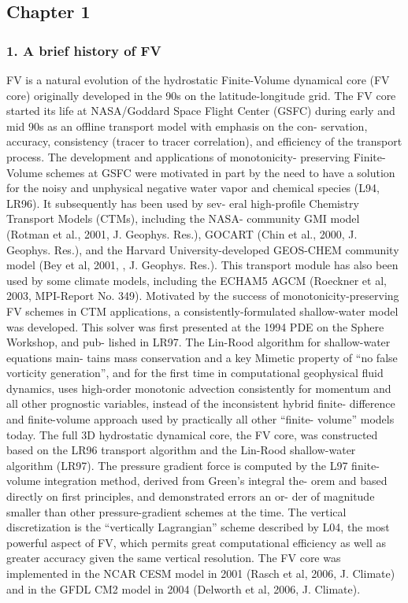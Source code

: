 \subsection*{Chapter 1}

\subsubsection*{1. A brief history of F\-V}

F\-V is a natural evolution of the hydrostatic Finite-\/\-Volume dynamical core (F\-V core) originally developed in the 90s on the latitude-\/longitude grid. The F\-V core started its life at N\-A\-S\-A/\-Goddard Space Flight Center (G\-S\-F\-C) during early and mid 90s as an offline transport model with emphasis on the con-\/ servation, accuracy, consistency (tracer to tracer correlation), and efficiency of the transport process. The development and applications of monotonicity-\/ preserving Finite-\/\-Volume schemes at G\-S\-F\-C were motivated in part by the need to have a solution for the noisy and unphysical negative water vapor and chemical species (L94, L\-R96). It subsequently has been used by sev-\/ eral high-\/profile Chemistry Transport Models (C\-T\-Ms), including the N\-A\-S\-A-\/ community G\-M\-I model (Rotman et al., 2001, J. Geophys. Res.), G\-O\-C\-A\-R\-T (Chin et al., 2000, J. Geophys. Res.), and the Harvard University-\/developed G\-E\-O\-S-\/\-C\-H\-E\-M community model (Bey et al, 2001, , J. Geophys. Res.). This transport module has also been used by some climate models, including the E\-C\-H\-A\-M5 A\-G\-C\-M (Roeckner et al, 2003, M\-P\-I-\/\-Report No. 349). Motivated by the success of monotonicity-\/preserving F\-V schemes in C\-T\-M applications, a consistently-\/formulated shallow-\/water model was developed. This solver was first presented at the 1994 P\-D\-E on the Sphere Workshop, and pub-\/ lished in L\-R97. The Lin-\/\-Rood algorithm for shallow-\/water equations main-\/ tains mass conservation and a key Mimetic property of “no false vorticity generation”, and for the first time in computational geophysical fluid dynamics, uses high-\/order monotonic advection consistently for momentum and all other prognostic variables, instead of the inconsistent hybrid finite-\/ difference and finite-\/volume approach used by practically all other “finite-\/ volume” models today. The full 3\-D hydrostatic dynamical core, the F\-V core, was constructed based on the L\-R96 transport algorithm and the Lin-\/\-Rood shallow-\/water algorithm (L\-R97). The pressure gradient force is computed by the L97 finite-\/volume integration method, derived from Green’s integral the-\/ orem and based directly on first principles, and demonstrated errors an or-\/ der of magnitude smaller than other pressure-\/gradient schemes at the time. The vertical discretization is the “vertically Lagrangian” scheme described by L04, the most powerful aspect of F\-V, which permits great computational efficiency as well as greater accuracy given the same vertical resolution. The F\-V core was implemented in the N\-C\-A\-R C\-E\-S\-M model in 2001 (Rasch et al, 2006, J. Climate) and in the G\-F\-D\-L C\-M2 model in 2004 (Delworth et al, 2006, J. Climate).

